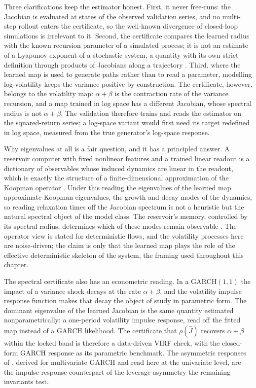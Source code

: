 \documentclass[12pt,a4paper]{article}
\begin{document}
Three clarifications keep the estimator honest. First, it never
free-runs: the Jacobian is evaluated at states of the observed
validation series, and no multi-step rollout enters the certificate, so
the well-known divergence of closed-loop simulations is irrelevant to
it. Second, the certificate compares the learned radius with the known
recursion parameter of a simulated process; it is not an estimate of a
Lyapunov exponent of a stochastic system, a quantity with its own strict
definition through products of Jacobians along a trajectory
\citep{nelson1990}. Third,
where the learned map is used to generate paths rather than to read a
parameter, modelling log-volatility keeps the variance positive by
construction. The certificate, however, belongs to the volatility map:
$\alpha+\beta$ is the contraction rate of the variance recursion, and a
map trained in log space has a different Jacobian, whose spectral
radius is not $\alpha+\beta$. The validation therefore trains and reads
the estimator on the squared-return series; a log-space variant would first
need its target redefined in log space, measured from the true
generator's log-space response.

Why eigenvalues at all is a fair question, and it has a principled
answer. A reservoir computer with fixed nonlinear features and a
trained linear readout is a dictionary of observables whose induced
dynamics are linear in the readout, which is exactly the structure of a
finite-dimensional approximation of the Koopman operator
\citep{gulinamauroy2021,guyangshi2026}. Under this reading the
eigenvalues of the learned map approximate Koopman eigenvalues, the
growth and decay modes of the dynamics, so reading relaxation times off
the Jacobian spectrum is not a heuristic but the natural spectral
object of the model class. The reservoir's memory, controlled by its
spectral radius, determines which of these modes remain observable
\citep{guyangshi2026}. The operator view is stated for deterministic
flows, and the volatility processes here are noise-driven; the claim is
only that the learned map plays the role of the effective deterministic
skeleton of the system, the framing used throughout this chapter.

The spectral certificate also has an econometric reading. In a
GARCH$(1,1)$ the impact of a variance shock decays at the rate
$\alpha+\beta$, and the volatility impulse response function
\citep{hafnerherwartz2006,hafnerherwartz2023} makes that decay the
object of study in parametric form. The dominant eigenvalue of the
learned Jacobian is the same quantity estimated nonparametrically: a
one-period volatility impulse response, read off the fitted map instead
of a GARCH likelihood. The certificate that $\rho(\hat{J})$ recovers
$\alpha+\beta$ within the locked band is therefore a data-driven VIRF
check, with the closed-form GARCH response as its parametric benchmark.
The asymmetric responses of
\citet{hafnerherwartz2023}, derived for multivariate GARCH and read
here at the univariate level, are the
impulse-response counterpart of the leverage asymmetry the remaining
invariants test.
\end{document}
